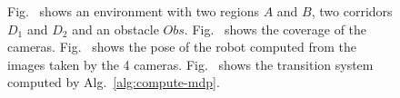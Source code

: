 
\begin{figure}[!htb]
\centering
{}
\caption{Fig.~
shows an environment with
two regions $A$ and $B$, two corridors
$D_1$ and $D_2$ and an obstacle $Obs$.
Fig.~
shows the coverage of the cameras.
Fig.~
shows the pose of the robot computed
from the images taken by the 4 cameras.
Fig.~
shows the transition system computed
by Alg.~\ref{alg:compute-mdp}.
}
\label{fig:simple-case}
\end{figure}


